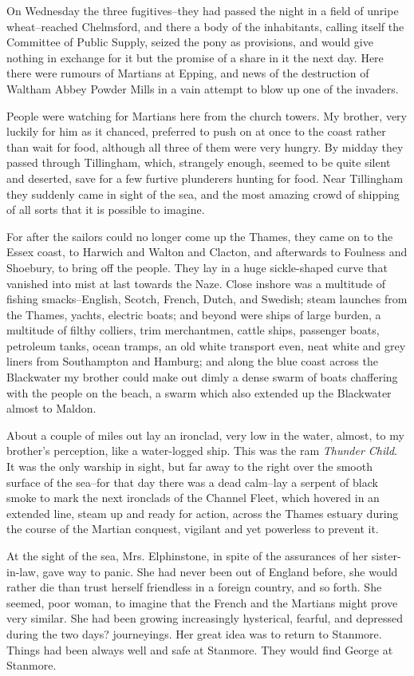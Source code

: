 On Wednesday the three fugitives--they had passed the night in a
field of unripe wheat--reached Chelmsford, and there a body of the
inhabitants, calling itself the Committee of Public Supply, seized
the pony as provisions, and would give nothing in exchange for it
but the promise of a share in it the next day. Here there were
rumours of Martians at Epping, and news of the destruction of
Waltham Abbey Powder Mills in a vain attempt to blow up one of the
invaders.

People were watching for Martians here from the church towers. My
brother, very luckily for him as it chanced, preferred to push on
at once to the coast rather than wait for food, although all three
of them were very hungry. By midday they passed through Tillingham,
which, strangely enough, seemed to be quite silent and deserted,
save for a few furtive plunderers hunting for food. Near Tillingham
they suddenly came in sight of the sea, and the most amazing crowd
of shipping of all sorts that it is possible to imagine.

For after the sailors could no longer come up the Thames, they came
on to the Essex coast, to Harwich and Walton and Clacton, and
afterwards to Foulness and Shoebury, to bring off the people. They
lay in a huge sickle-shaped curve that vanished into mist at last
towards the Naze. Close inshore was a multitude of fishing
smacks--English, Scotch, French, Dutch, and Swedish; steam launches
from the Thames, yachts, electric boats; and beyond were ships of
large burden, a multitude of filthy colliers, trim merchantmen,
cattle ships, passenger boats, petroleum tanks, ocean tramps, an
old white transport even, neat white and grey liners from
Southampton and Hamburg; and along the blue coast across the
Blackwater my brother could make out dimly a dense swarm of boats
chaffering with the people on the beach, a swarm which also
extended up the Blackwater almost to Maldon.

About a couple of miles out lay an ironclad, very low in the water,
almost, to my brother's perception, like a water-logged ship. This
was the ram \emph{Thunder Child}. It was the only warship in sight,
but far away to the right over the smooth surface of the sea--for
that day there was a dead calm--lay a serpent of black smoke to
mark the next ironclads of the Channel Fleet, which hovered in an
extended line, steam up and ready for action, across the Thames
estuary during the course of the Martian conquest, vigilant and yet
powerless to prevent it.

At the sight of the sea, Mrs. Elphinstone, in spite of the
assurances of her sister-in-law, gave way to panic. She had never
been out of England before, she would rather die than trust herself
friendless in a foreign country, and so forth. She seemed, poor
woman, to imagine that the French and the Martians might prove very
similar. She had been growing increasingly hysterical, fearful, and
depressed during the two days? journeyings. Her great idea was to
return to Stanmore. Things had been always well and safe at
Stanmore. They would find George at Stanmore.

